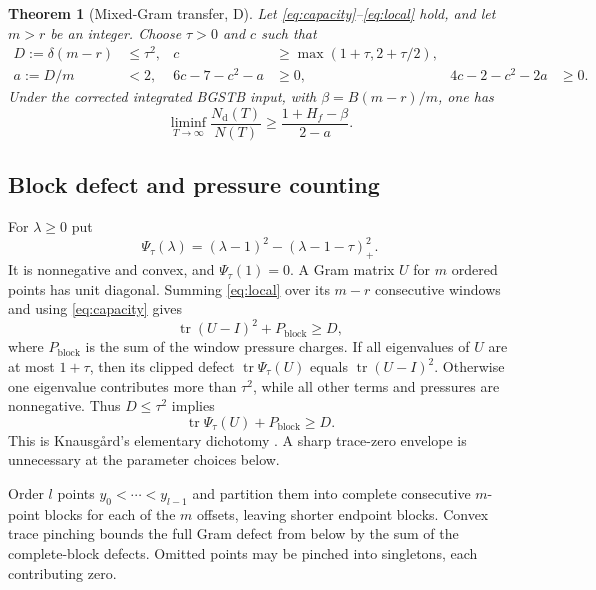 \documentclass[11pt]{article}
\newcommand{\tr}{\operatorname{tr}}
\newcommand{\Nd}{N_{\mathrm d}}
\newtheorem{theorem}{Theorem}
\theoremstyle{remark}\newtheorem{remark}[theorem]{Remark}
\begin{document}
\begin{theorem}[Mixed-Gram transfer, D]\label{thm:transfer}
Let \eqref{eq:capacity}--\eqref{eq:local} hold, and let $m>r$ be an integer.
Choose $\tau>0$ and $c$ such that
\begin{align}\label{eq:conditions}
 D:=\delta(m-r)&\le\tau^2,&
 c&\ge\max(1+\tau,2+\tau/2),\\
 a:=D/m&<2,&
 6c-7-c^2-a&\ge0,&4c-2-c^2-2a&\ge0.\nonumber
\end{align}
Under the corrected integrated BGSTB input, with
$\beta=B(m-r)/m$, one has
\begin{equation}\label{eq:transfer}
 \liminf_{T\to\infty}\frac{\Nd(T)}{N(T)}
 \ge\frac{1+H_f-\beta}{2-a}.
\end{equation}
\end{theorem}

\subsection{Block defect and pressure counting}
For $\lambda\ge0$ put
\[
 \Psi_\tau(\lambda)=(\lambda-1)^2-(\lambda-1-\tau)_+^2.
\]
It is nonnegative and convex, and $\Psi_\tau(1)=0$. A Gram matrix $U$
for $m$ ordered points has unit diagonal. Summing \eqref{eq:local} over its
$m-r$ consecutive windows and using \eqref{eq:capacity} gives
\begin{equation}\label{eq:blockenergy}
 \tr(U-I)^2+P_{\mathrm{block}}\ge D,
\end{equation}
where $P_{\mathrm{block}}$ is the sum of the window pressure charges.
If all eigenvalues of $U$ are at most $1+\tau$, then its clipped defect
$\tr\Psi_\tau(U)$ equals $\tr(U-I)^2$. Otherwise one eigenvalue contributes
more than $\tau^2$, while all other terms and pressures are nonnegative.
Thus $D\le\tau^2$ implies
\begin{equation}\label{eq:dichotomy}
 \tr\Psi_\tau(U)+P_{\mathrm{block}}\ge D.
\end{equation}
This is Knausg\aa rd's elementary dichotomy \cite{knausgard}. A sharp
trace-zero envelope is unnecessary at the parameter choices below.

Order $l$ points $y_0<\cdots<y_{l-1}$ and partition them into complete
consecutive $m$-point blocks for each of the $m$ offsets, leaving shorter
endpoint blocks. Convex trace pinching bounds the full Gram defect from
below by the sum of the complete-block defects. Omitted points may be
pinched into singletons, each contributing zero.
\end{document}
